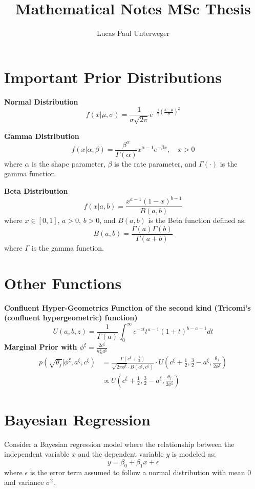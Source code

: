 \documentclass[12pt,a4paper]{article}
\author{Lucas Paul Unterweger}
\title{Mathematical Notes MSc Thesis}
\begin{document}
\maketitle

\section{Important Prior Distributions}

\textbf{Normal Distribution}
\[
f(x|\mu, \sigma) = \frac{1}{\sigma\sqrt{2\pi}} e^{-\frac{1}{2}\left(\frac{x-\mu}{\sigma}\right)^2}
\]

\textbf{Gamma Distribution}
\begin{equation*}
f(x|\alpha,\beta) = \frac{\beta^\alpha}{\Gamma(\alpha)} x^{\alpha-1} e^{-\beta x}, \quad x > 0
\end{equation*}
where $\alpha$ is the shape parameter, $\beta$ is the rate parameter, and $\Gamma(\cdot)$ is the gamma function.

\textbf{Beta Distribution}
\begin{equation*}
f(x|a,b) = \frac{x^{a-1}(1-x)^{b-1}}{B(a,b)}
\end{equation*}
where $x \in [0,1]$, $a > 0$, $b > 0$, and $B(a,b)$ is the Beta function defined as:
\begin{equation*}
B(a,b) = \frac{\Gamma(a)\Gamma(b)}{\Gamma(a+b)}
\end{equation*}
where $\Gamma$ is the gamma function.\\

\section{Other Functions}
\textbf{Confluent Hyper-Geometrics Function of the second kind (Tricomi's (confluent hypergeometric) function)}
\[
U(a,b,z) = \frac{1}{\Gamma(a)}\int_0^\infty e^{-zt}t^{a-1}(1+t)^{b-a-1}dt
\]
\textbf{Marginal Prior with $\phi^\xi = \frac{2c^\xi}{\kappa_B^2a^\xi}$}
\begin{align*}
p(\sqrt{\theta_j}|\phi^\xi, a^\xi, c^\xi) &= \frac{\Gamma(c^\xi + \frac{1}{2})}{\sqrt{2\pi \phi^\xi}\cdot B(a^\xi, c^\xi)}\cdot U\left(c^\xi + \frac{1}{2}, \frac{3}{2}-a^\xi, \frac{\theta_j}{2\phi^\xi}\right)\\
&\propto U\left(c^\xi + \frac{1}{2}, \frac{3}{2}-a^\xi, \frac{\theta_j}{2\phi^\xi}\right)
\end{align*}



\section{Bayesian Regression}
Consider a Bayesian regression model where the relationship between the independent variable $x$ and the dependent variable $y$ is modeled as:
\begin{equation*}
y = \beta_0 + \beta_1 x + \epsilon
\end{equation*}
where $\epsilon$ is the error term assumed to follow a normal distribution with mean $0$ and variance $\sigma^2$.
\end{document}
